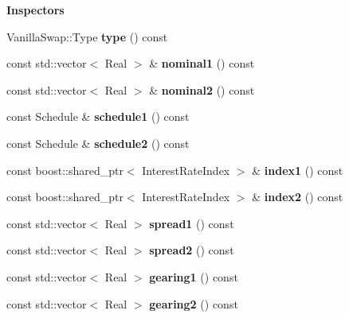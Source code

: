 \begin{Indent}{\bf Inspectors}\par
\begin{DoxyCompactItemize}
\item 
Vanilla\+Swap\+::\+Type {\bfseries type} () const \label{class_quant_lib_1_1_float_float_swap_a719a803b683500395a5b756497d76d7c}

\item 
const std\+::vector$<$ Real $>$ \& {\bfseries nominal1} () const \label{class_quant_lib_1_1_float_float_swap_a388cde5c0baa28b1b951b310d2a2dc04}

\item 
const std\+::vector$<$ Real $>$ \& {\bfseries nominal2} () const \label{class_quant_lib_1_1_float_float_swap_ac81efade7402abaafffb461faa703b57}

\item 
const Schedule \& {\bfseries schedule1} () const \label{class_quant_lib_1_1_float_float_swap_acd03e408bfa5f03af003add76ed7d6f0}

\item 
const Schedule \& {\bfseries schedule2} () const \label{class_quant_lib_1_1_float_float_swap_a3c52b1423205de6e5445ca8896507c3d}

\item 
const boost\+::shared\+\_\+ptr$<$ Interest\+Rate\+Index $>$ \& {\bfseries index1} () const \label{class_quant_lib_1_1_float_float_swap_a79e516947ee3c3cd5ebc04531f57be03}

\item 
const boost\+::shared\+\_\+ptr$<$ Interest\+Rate\+Index $>$ \& {\bfseries index2} () const \label{class_quant_lib_1_1_float_float_swap_a8cf0267bb916fe117ebd7cccfca517e3}

\item 
const std\+::vector$<$ Real $>$ {\bfseries spread1} () const \label{class_quant_lib_1_1_float_float_swap_a5bd66cc7cb311ee3176b52e81aef0737}

\item 
const std\+::vector$<$ Real $>$ {\bfseries spread2} () const \label{class_quant_lib_1_1_float_float_swap_aa4a03e5b2d939042f6b4e11963160fd4}

\item 
const std\+::vector$<$ Real $>$ {\bfseries gearing1} () const \label{class_quant_lib_1_1_float_float_swap_a648f66c0f680dedd4373aa532cd0c495}

\item 
const std\+::vector$<$ Real $>$ {\bfseries gearing2} () const \label{class_quant_lib_1_1_float_float_swap_a8d29157c074358dcf835bc30339d5ae4}


\end{DoxyCompactItemize}
\end{Indent}
